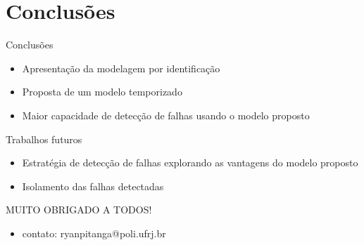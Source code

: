 \documentclass[xcolor=x11names,compress,framenumber]{beamer}
\renewcommand{\(}{\begin{columns}}
\renewcommand{\)}{\end{columns}}
\newcommand{\<}[1]{\begin{column}{#1}}
\renewcommand{\>}{\end{column}}
\begin{document}
\section{Conclusões}

\begin{frame}{Conclusões}
	\begin{block}{}
		\begin{itemize}
			\item Apresentação da modelagem por identificação
			\item Proposta de um modelo temporizado
			\item Maior capacidade de detecção de falhas usando o modelo proposto
		\end{itemize}
	\end{block}
	\begin{block}{Trabalhos futuros}
		\begin{itemize}
			\item Estratégia de detecção de falhas explorando as vantagens do modelo proposto
			\item Isolamento das falhas detectadas
		\end{itemize}
	\end{block}
\end{frame}

\begin{frame}
\Large{MUITO OBRIGADO A TODOS!}
\begin{center}
\begin{itemize}
\item contato: ryanpitanga@poli.ufrj.br
\end{itemize}
\end{center}
\end{frame}

%	
\end{document}
